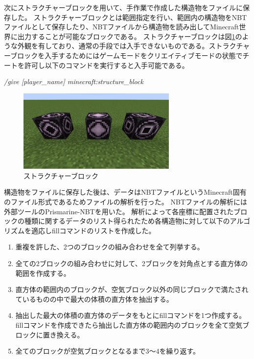 次にストラクチャーブロックを用いて、手作業で作成した構造物をファイルに保存した。
ストラクチャーブロックとは範囲指定を行い、範囲内の構造物をNBTファイルとして保存したり、NBTファイルから構造物を読み出してMinecraft世界に出力することが可能なブロックである。
ストラクチャーブロックは図\ref{fig:structure_block}のような外観を有しており、通常の手段では入手できないものである。ストラクチャーブロックを入手するためにはゲームモードをクリエイティブモードの状態でチートを許可し以下のコマンドを実行すると入手可能である。
\begin{center}
    \textit{/give [player\_name] minecraft:structure\_block}
\end{center}

\begin{figure}[H]
    \centering
    \includegraphics[width=0.7\textwidth]{fig/structure_block.png}
    \caption{ストラクチャーブロック}
    \label{fig:structure_block}
\end{figure}

構造物をファイルに保存した後は、データはNBTファイルというMinecraft固有のファイル形式であるためファイルの解析を行った。
NBTファイルの解析には外部ツールのPrismarine-NBT\cite{bib:prismarine-nbt}を用いた。
解析によって各座標に配置されたブロックの種類に関するデータのリスト得られたため各構造物に対して以下のアルゴリズムを適応しfillコマンドのリストを作成した。

\begin{enumerate}
    \item 重複を許した、2つのブロックの組み合わせを全て列挙する。
    \item 全ての2ブロックの組み合わせに対して、2ブロックを対角点とする直方体の範囲を作成する。
    \item 直方体の範囲内のブロックが、空気ブロック以外の同じブロックで満たされているものの中で最大の体積の直方体を抽出する。
    \item 抽出した最大の体積の直方体のデータをもとにfillコマンドを1つ作成する。fillコマンドを作成できたら抽出した直方体の範囲内のブロックを全て空気ブロックに置き換える。
    \item 全てのブロックが空気ブロックとなるまで3～4を繰り返す。
\end{enumerate}


